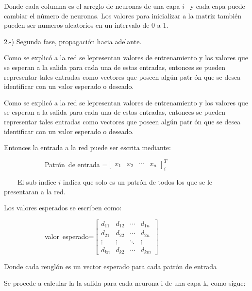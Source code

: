 Donde cada columna es el arreglo de neuronas de una capa $i$ \ y cada capa
puede cambiar el n\'{u}mero de neuronas. Los valores para inicializar a la
matriz tambi\'{e}n pueden ser numeros aleatorios en un intervalo de 0 a 1.

2.-) Segunda fase, propagaci\'{o}n hacia adelante.

Como se explic\'{o} a la red se lepresentan valores de entrenamiento y los
valores que se esperan a la salida para cada una de estas entradas, entonces
se pueden representar tales entradas como vectores que poseen alg\'{u}n patr%
\'{o}n que se desea identificar con un valor esperado o deseado.

Como se explic\'{o} a la red se lepresentan valores de entrenamiento y los
valores que se esperan a la salida para cada una de estas entradas, entonces
se pueden representar tales entradas como vectores que poseen alg\'{u}n patr%
\'{o}n que se desea identificar con un valor esperado o deseado.

Entonces la entrada a la red puede ser escrita mediante:

$\qquad \qquad \qquad $Patr\'{o}n\ de entrada =$\left[
\begin{array}{cccc}
x_{1} & x_{2} & \cdots  & x_{n}%
\end{array}%
\right] _{i}^{T}$

\ \ \ \ El sub \'{\i}ndice $i$ indica que solo es un patr\'{o}n de todos los
que se le presentaran a la red.

Los valores esperados se escriben como:

\bigskip $\qquad \qquad \qquad $valor\ esperado=$\left[
\begin{array}{cccc}
d_{11} & d_{12} & \cdots  & d_{1n} \\
d_{21} & d_{22} & \cdots  & d_{2n} \\
\vdots  & \vdots  & \ddots  & \vdots  \\
d_{kn} & d_{k2} & \cdots  & d_{km}%
\end{array}%
\right] $

Donde cada rengl\'{o}n es un vector esperado para cada patr\'{o}n de entrada

\bigskip

Se procede a calcular la la salida para cada neurona i de \bigskip una capa
k, como sigue:


